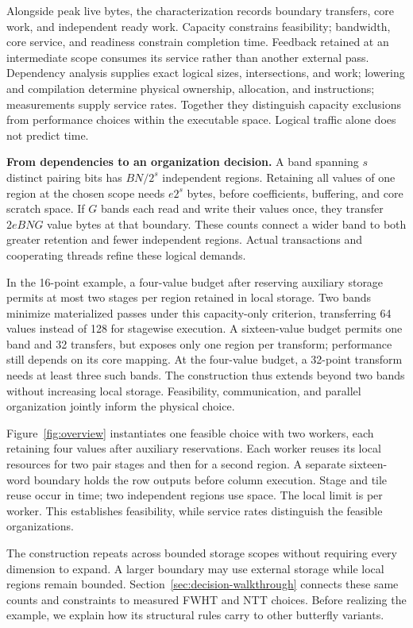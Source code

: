 Alongside peak live bytes, the characterization records boundary transfers,
core work, and independent ready work. Capacity constrains feasibility;
bandwidth, core service, and readiness constrain completion time. Feedback retained at an intermediate scope consumes its service rather than
another external pass. Dependency analysis supplies exact logical sizes,
intersections, and work; lowering and compilation determine physical ownership,
allocation, and instructions; measurements supply service rates. Together they
distinguish capacity exclusions from performance choices within the executable
space. Logical traffic alone does not predict time.

\noindent\textbf{From dependencies to an organization decision.}
A band spanning $s$ distinct pairing bits has $BN/2^s$ independent
regions. Retaining all values of one region at the chosen scope needs
$e2^s$ bytes, before coefficients, buffering, and core scratch space.
If $G$ bands each read and write their values once, they transfer $2eBNG$
value bytes at that boundary. These counts connect a wider band to both
greater retention and fewer independent regions. Actual transactions and
cooperating threads refine these logical demands.

In the 16-point example, a four-value budget after reserving auxiliary storage
permits at most two stages per region retained in local storage. Two bands minimize
materialized passes under this capacity-only criterion, transferring 64 values
instead of 128 for stagewise execution. A sixteen-value budget permits one
band and 32 transfers, but exposes only one region per transform;
performance still depends on its core mapping. At the four-value budget,
a 32-point transform needs at least three such bands. The construction thus
extends beyond two bands without increasing local storage. Feasibility,
communication, and parallel organization jointly inform the physical choice.

Figure~\ref{fig:overview} instantiates one feasible choice with two workers,
each retaining four values after auxiliary reservations. Each worker reuses
its local resources for two pair stages and then for a second region. A
separate sixteen-word boundary holds the row outputs before column execution.
Stage and tile reuse occur in time; two independent regions use space. The
local limit is per worker. This establishes feasibility, while service rates
distinguish the feasible organizations.

The construction repeats across bounded storage scopes without requiring
every dimension to expand. A larger boundary may use external storage while
local regions remain bounded. Section~\ref{sec:decision-walkthrough} connects
these same counts and constraints to measured FWHT and NTT choices. Before
realizing the example, we explain how its structural rules carry to other
butterfly variants.

